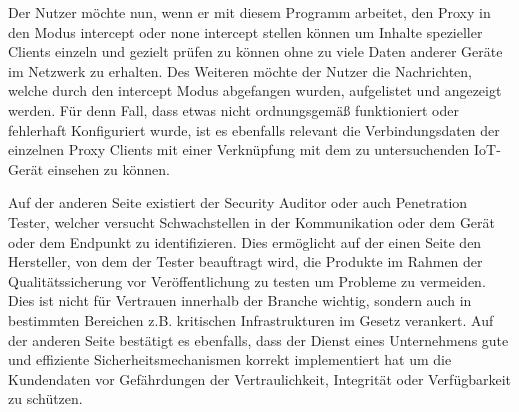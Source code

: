     Der Nutzer möchte nun, wenn er mit diesem Programm arbeitet, den Proxy in den Modus \glqq intercept\grqq{} oder \glqq none intercept\grqq{} stellen können um Inhalte spezieller Clients einzeln und gezielt prüfen zu können ohne zu viele Daten anderer Geräte im Netzwerk zu erhalten.
    Des Weiteren möchte der Nutzer die Nachrichten, welche durch den \glqq intercept\grqq{} Modus abgefangen wurden, aufgelistet und angezeigt werden.
    Für denn Fall, dass etwas nicht ordnungsgemäß funktioniert oder fehlerhaft Konfiguriert wurde, ist es ebenfalls relevant die Verbindungsdaten der einzelnen Proxy Clients mit einer Verknüpfung mit dem zu untersuchenden \ac{IoT}-Gerät einsehen zu können.
    
    Auf der anderen Seite existiert der Security Auditor oder auch Penetration Tester, welcher versucht Schwachstellen in der Kommunikation oder dem Gerät oder dem Endpunkt zu identifizieren.
    Dies ermöglicht auf der einen Seite den Hersteller, von dem der Tester beauftragt wird, die Produkte im Rahmen der Qualitätssicherung vor Veröffentlichung zu testen um Probleme zu vermeiden. Dies ist nicht für Vertrauen innerhalb der Branche wichtig, sondern auch in bestimmten Bereichen z.B. kritischen Infrastrukturen im Gesetz verankert.
    Auf der anderen Seite bestätigt es ebenfalls, dass der Dienst eines Unternehmens gute und effiziente Sicherheitsmechanismen korrekt implementiert hat um die Kundendaten vor Gefährdungen der Vertraulichkeit, Integrität oder Verfügbarkeit zu schützen.
    
